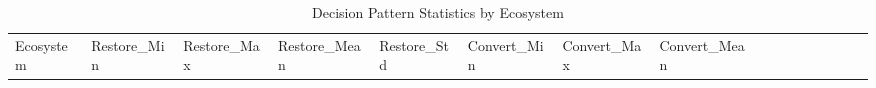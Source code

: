 \documentclass[
  letterpaper,
  DIV=11,
  numbers=noendperiod]{scrartcl}
\begin{document}
\begin{longtable}[]{@{}
  >{\raggedright\arraybackslash}p{}
  >{\raggedleft\arraybackslash}p{}
  >{\raggedleft\arraybackslash}p{}
  >{\raggedleft\arraybackslash}p{}
  >{\raggedleft\arraybackslash}p{}
  >{\raggedleft\arraybackslash}p{}
  >{\raggedleft\arraybackslash}p{}
  >{\raggedleft\arraybackslash}p{}
  >{\raggedleft\arraybackslash}p{}
  >{\raggedleft\arraybackslash}p{}
  >{\raggedleft\arraybackslash}p{}
  >{\raggedleft\arraybackslash}p{}
  >{\raggedleft\arraybackslash}p{}
  >{\raggedleft\arraybackslash}p{}
  >{\raggedleft\arraybackslash}p{}
  >{\raggedleft\arraybackslash}p{}@{}}
\caption{Decision Pattern Statistics by Ecosystem}\tabularnewline
\toprule\noalign{}
\begin{minipage}[b]{\linewidth}\raggedright
Ecosystem
\end{minipage} & \begin{minipage}[b]{\linewidth}\raggedleft
Restore\_Min
\end{minipage} & \begin{minipage}[b]{\linewidth}\raggedleft
Restore\_Max
\end{minipage} & \begin{minipage}[b]{\linewidth}\raggedleft
Restore\_Mean
\end{minipage} & \begin{minipage}[b]{\linewidth}\raggedleft
Restore\_Std
\end{minipage} & \begin{minipage}[b]{\linewidth}\raggedleft
Convert\_Min
\end{minipage} & \begin{minipage}[b]{\linewidth}\raggedleft
Convert\_Max
\end{minipage} & \begin{minipage}[b]{\linewidth}\raggedleft
Convert\_Mean
\end{minipage} & \begin{minipage}[b]{\linewidth}\raggedleft

\end{minipage}
\end{longtable}
\end{document}
